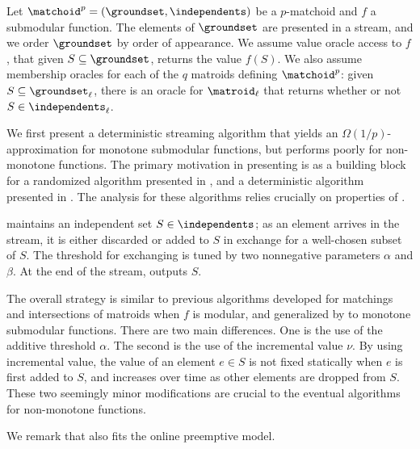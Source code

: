 \documentclass[oneside,letterpaper]{scrartcl} \usepackage{macros}
\newcommand{\mcard}{q}\newcommand{\nmat}{q}
\newcommand{\mindex}{\ell}
\newcommand{\pmatchoid}{\matchoid^p} \newcommand{\defpmatchoid}{\pmatchoid = (\groundset,\independents)} \newcommand{\matroidI}{\matroid_{\mindex}} \newcommand{\groundsetI}{\groundset_{\mindex}} \newcommand{\independentsI}{\independents_{\mindex}} \newcommand{\defmatroidI}{\matroidI = (\groundsetI,\independentsI)} \newcommand{\offlineratio}{\gamma_p} \newcommand{\optset}{T^*}
\begin{document}
Let $\defpmatchoid$ be a $p$-matchoid and $f$ a submodular
function. The elements of $\groundset$ are presented in a stream, and
we order $\groundset$ by order of appearance. We assume value oracle
access to $f$, that given $S \subseteq \groundset$, returns the value
$f(S)$. We also assume membership oracles for each of the $\mcard$
matroids defining $\pmatchoid$: given $S \subseteq \groundsetI$, there
is an oracle for $\matroidI$ that returns whether or not $S \in
\independentsI$.



We first present a deterministic streaming algorithm
 that yields an
$\Omega(1/p)$-{\allowbreak}approximation for monotone submodular
functions, but performs poorly for non-monotone functions. The primary
motivation in presenting  is as a building
block for a randomized algorithm 
presented in , and a
deterministic algorithm  presented
in . The analysis for these
algorithms relies crucially on properties of
.

 maintains an independent set $S \in
\independents$; as an element arrives in the stream, it is either
discarded or added to $S$ in exchange for a well-chosen subset of $S$.
The threshold for exchanging is tuned by two nonnegative parameters
$\alpha$ and $\beta$.  At the end of the stream,
 outputs $S$.

The overall strategy is similar to previous algorithms developed for
matchings \cite{fkmsz-gpssm-05,m-fgmds-05} and intersections of
matroids \cite{abv-11} when $f$ is modular, and generalized by
\cite{ck-smms-14} to monotone submodular functions.  There are two
main differences. One is the use of the additive threshold
$\alpha$. The second is the use of the incremental value $\nu$. By
using incremental value, the value of an element $e \in S$ is not
fixed statically when $e$ is first added to $S$, and increases over
time as other elements are dropped from $S$. These two seemingly minor
modifications are crucial to the eventual algorithms for non-monotone
functions.



We remark that  also fits the online
preemptive model.


\newcommand{\replacement}{e(\deleted)} 
\end{document}
